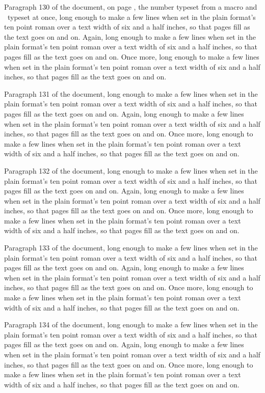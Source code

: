 Paragraph 130 of the document, \edef\pg{\the\pageno}\message{[on \pg]}on page \pg, the number typeset from a macro and \the{}\ typeset at once, long enough to make a few lines when set in the plain format's ten point roman over a text width of six and a half inches, so that pages fill as the text goes on and on. Again, long enough to make a few lines when set in the plain format's ten point roman over a text width of six and a half inches, so that pages fill as the text goes on and on. Once more, long enough to make a few lines when set in the plain format's ten point roman over a text width of six and a half inches, so that pages fill as the text goes on and on.

Paragraph 131 of the document, long enough to make a few lines when set in the plain format's ten point roman over a text width of six and a half inches, so that pages fill as the text goes on and on. Again, long enough to make a few lines when set in the plain format's ten point roman over a text width of six and a half inches, so that pages fill as the text goes on and on. Once more, long enough to make a few lines when set in the plain format's ten point roman over a text width of six and a half inches, so that pages fill as the text goes on and on.

Paragraph 132 of the document, long enough to make a few lines when set in the plain format's ten point roman over a text width of six and a half inches, so that pages fill as the text goes on and on. Again, long enough to make a few lines when set in the plain format's ten point roman over a text width of six and a half inches, so that pages fill as the text goes on and on. Once more, long enough to make a few lines when set in the plain format's ten point roman over a text width of six and a half inches, so that pages fill as the text goes on and on.

Paragraph 133 of the document, long enough to make a few lines when set in the plain format's ten point roman over a text width of six and a half inches, so that pages fill as the text goes on and on. Again, long enough to make a few lines when set in the plain format's ten point roman over a text width of six and a half inches, so that pages fill as the text goes on and on. Once more, long enough to make a few lines when set in the plain format's ten point roman over a text width of six and a half inches, so that pages fill as the text goes on and on.

Paragraph 134 of the document, long enough to make a few lines when set in the plain format's ten point roman over a text width of six and a half inches, so that pages fill as the text goes on and on. Again, long enough to make a few lines when set in the plain format's ten point roman over a text width of six and a half inches, so that pages fill as the text goes on and on. Once more, long enough to make a few lines when set in the plain format's ten point roman over a text width of six and a half inches, so that pages fill as the text goes on and on.

